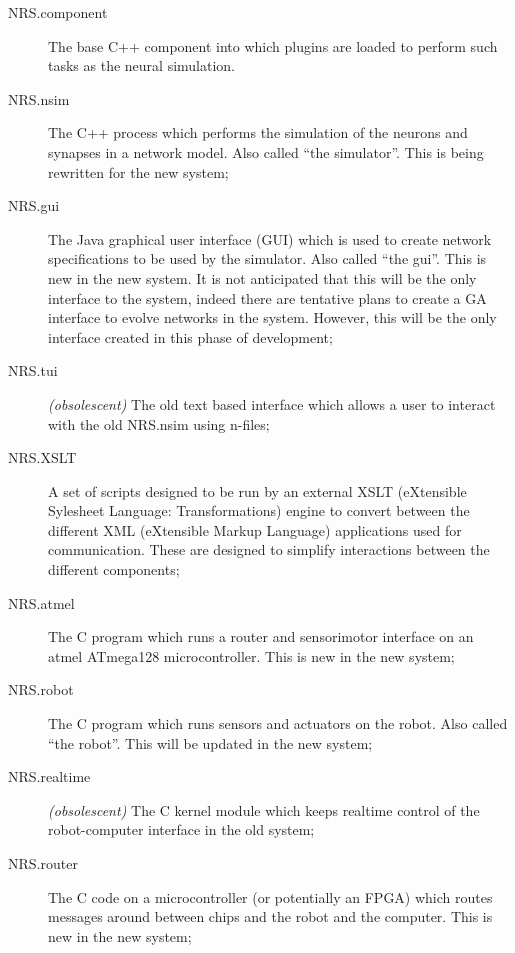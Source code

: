 \documentclass[pdftex,a4paper]{article}
\begin{document}
\begin{description}

\item[NRS.component] The base C++ component into which plugins are
loaded to perform such tasks as the neural simulation.

\item[NRS.nsim] The C++ process which performs the simulation of the
  neurons and synapses in a network model. Also called ``the
  simulator''. This is being rewritten for the new system;

\item[NRS.gui] The Java graphical user interface (GUI) which is used
  to create network specifications to be used by the simulator. Also
  called ``the gui''. This is new in the new system. It is not
  anticipated that this will be the only interface to the system,
  indeed there are tentative plans to create a GA interface to evolve
  networks in the system. However, this will be the only interface
  created in this phase of development;

\item[NRS.tui] {\em (obsolescent)} The old text based interface
which allows a user to interact with the old NRS.nsim using n-files;

\item[NRS.XSLT] A set of scripts designed to be run by an external
  XSLT (eXtensible Sylesheet Language: Transformations) engine to
  convert between the different XML (eXtensible Markup Language)
  applications used for communication. These are designed to simplify
  interactions between the different components;

\item[NRS.atmel] The C program which runs a router and sensorimotor
  interface on an atmel ATmega128 microcontroller. This is new in the
  new system;

\item[NRS.robot] The C program which runs sensors and actuators on the
  robot. Also called ``the robot''. This will be updated in the new
  system;

\item[NRS.realtime] {\em (obsolescent)} The C kernel module which
  keeps realtime control of the robot-computer interface in the old
  system;

\item[NRS.router] The C code on a microcontroller (or potentially an
  FPGA) which routes messages around between chips and the robot and
  the computer. This is new in the new system;


\end{description}
\end{document}
